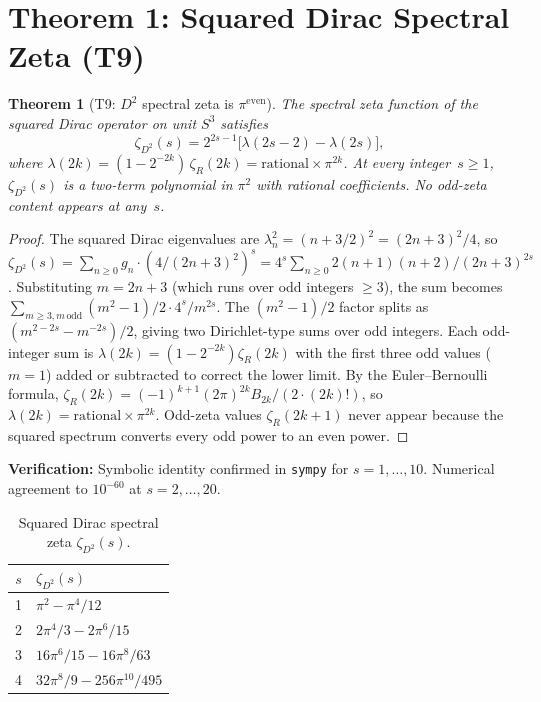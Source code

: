 \documentclass[11pt]{article}
\newtheorem{theorem}{Theorem}
\begin{document}
\section{Theorem 1: Squared Dirac Spectral Zeta (T9)}
\label{sec:T9}

\begin{theorem}[T9: $D^2$ spectral zeta is $\pi^{\mathrm{even}}$]
\label{thm:T9}
The spectral zeta function of the squared Dirac operator on unit
$S^3$ satisfies
\begin{equation}
  \zeta_{D^2}(s)
    = 2^{2s-1}\bigl[\lambda(2s{-}2) - \lambda(2s)\bigr],
  \label{eq:T9}
\end{equation}
where $\lambda(2k) = (1 - 2^{-2k})\,\zeta_R(2k)
= \mathrm{rational} \times \pi^{2k}$.
At every integer~$s \ge 1$, $\zeta_{D^2}(s)$ is a two-term polynomial
in $\pi^2$ with rational coefficients.  No odd-zeta content appears
at any~$s$.
\end{theorem}

\begin{proof}
The squared Dirac eigenvalues are $\lambda_n^2 = (n + 3/2)^2
= (2n+3)^2/4$, so
$\zeta_{D^2}(s) = \sum_{n \ge 0} g_n \cdot (4/(2n+3)^2)^s
= 4^s \sum_{n \ge 0} 2(n+1)(n+2) / (2n+3)^{2s}$.
Substituting $m = 2n+3$ (which runs over odd integers $\ge 3$), the
sum becomes $\sum_{m \ge 3, m\,\mathrm{odd}} (m^2-1)/2 \cdot
4^s / m^{2s}$.  The $(m^2 - 1)/2$ factor splits as
$(m^{2-2s} - m^{-2s})/2$, giving two Dirichlet-type sums over odd
integers.  Each odd-integer sum is $\lambda(2k) = (1-2^{-2k})\zeta_R(2k)$
with the first three odd values ($m=1$) added or subtracted to correct
the lower limit.  By the Euler--Bernoulli formula,
$\zeta_R(2k) = (-1)^{k+1} (2\pi)^{2k} B_{2k} / (2\cdot (2k)!)$,
so $\lambda(2k) = \mathrm{rational} \times \pi^{2k}$.  Odd-zeta values
$\zeta_R(2k+1)$ never appear because the squared spectrum converts every
odd power to an even power.
\end{proof}

\noindent\textbf{Verification:} Symbolic identity confirmed in
\texttt{sympy} for $s = 1, \ldots, 10$.  Numerical agreement to
$10^{-60}$ at $s = 2, \ldots, 20$.

\begin{table}[h]
\centering
\caption{Squared Dirac spectral zeta $\zeta_{D^2}(s)$.}
\label{tab:D2_values}
\begin{tabular}{@{}cl@{}}
\toprule
$s$ & $\zeta_{D^2}(s)$ \\
\midrule
1 & $\pi^2 - \pi^4/12$ \\
2 & $2\pi^4/3 - 2\pi^6/15$ \\
3 & $16\pi^6/15 - 16\pi^8/63$ \\
4 & $32\pi^8/9 - 256\pi^{10}/495$ \\
\bottomrule
\end{tabular}
\end{table}
\end{document}
